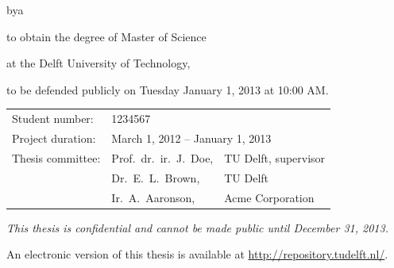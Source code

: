 \begin{titlepage}


\begin{center}


{\makeatletter
\largetitlestyle\fontsize{64}{94}\selectfont\@title
\makeatother}

{\makeatletter
\ifx\@subtitle\undefined\else
    \bigskip
   {\tudsffamily\fontsize{22}{32}\selectfont\@subtitle}    
\fi
\makeatother}

\bigskip
\bigskip

bya

\bigskip
\bigskip

{\makeatletter
\largetitlestyle\fontsize{26}{26}\selectfont\@author
\makeatother}

\bigskip
\bigskip

to obtain the degree of Master of Science

at the Delft University of Technology,

to be defended publicly on Tuesday January 1, 2013 at 10:00 AM.

\vfill

\begin{tabular}{lll}
    Student number: & 1234567 \\
    Project duration: & \multicolumn{2}{l}{March 1, 2012 -- January 1, 2013} \\
    Thesis committee: & Prof.\ dr.\ ir.\ J.\ Doe, & TU Delft, supervisor \\
        & Dr.\ E.\ L.\ Brown, & TU Delft \\
        & Ir.\ A.\ Aaronson, & Acme Corporation
\end{tabular}

\bigskip
\bigskip
\emph{This thesis is confidential and cannot be made public until December 31, 2013.}

\bigskip
\bigskip
An electronic version of this thesis is available at \url{http://repository.tudelft.nl/}.


\end{center}
\end{titlepage}
